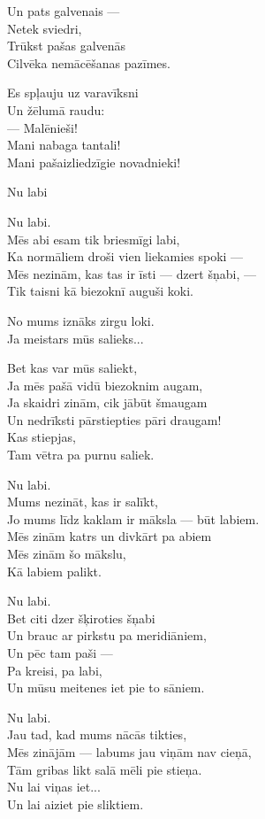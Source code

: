 \documentclass[14pt]{extarticle}
\begin{document}
Un pats galvenais ---\\
Netek sviedri,\\
Trūkst pašas galvenās\\
Cilvēka nemācēšanas pazīmes.

Es spļauju uz varavīksni\\
Un žēlumā raudu:\\
--- Malēnieši!\\
Mani nabaga tantali!\\
Mani pašaizliedzīgie novadnieki!


\newpage

{\large \sc Nu labi}

Nu labi.\\
Mēs abi esam tik briesmīgi labi,\\
Ka normāliem droši vien liekamies spoki ---\\
Mēs nezinām, kas tas ir īsti --- dzert šņabi, ---\\
Tik taisni kā biezoknī auguši koki.

No mums iznāks zirgu loki.\\
Ja meistars mūs salieks...

Bet kas var mūs saliekt,\\
Ja mēs pašā vidū biezoknim augam,\\
Ja skaidri zinām, cik jābūt šmaugam\\
Un nedrīksti pārstiepties pāri draugam!\\
Kas stiepjas,\\
Tam vētra pa purnu saliek.

Nu labi.\\
Mums nezināt, kas ir salīkt,\\
Jo mums līdz kaklam ir māksla --- būt labiem.\\
Mēs zinām katrs un divkārt pa abiem\\
Mēs zinām šo mākslu,\\
Kā labiem palikt.

Nu labi.\\
Bet citi dzer šķiroties šņabi\\
Un brauc ar pirkstu pa meridiāniem,\\
Un pēc tam paši ---\\
Pa kreisi, pa labi,\\
Un mūsu meitenes iet pie to sāniem.

Nu labi.\\
Jau tad, kad mums nācās tikties,\\
Mēs zinājām --- labums jau viņām nav cieņā,\\
Tām gribas likt salā mēli pie stieņa.\\
Nu lai viņas iet...\\
Un lai aiziet pie sliktiem.
\end{document}
